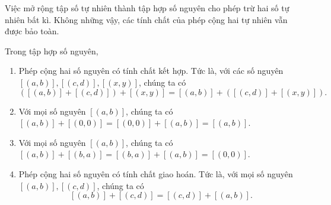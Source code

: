 Việc mở rộng tập số tự nhiên thành tập hợp số nguyên cho phép trừ hai số tự nhiên bất kì. Không những vậy, các tính chất của phép cộng hai tự nhiên vẫn được bảo toàn.
\begin{theorem}\label{theorem:group-of-integers}
	Trong tập hợp số nguyên,
	\begin{enumerate}[label={(\roman*)}]
		\item Phép cộng hai số nguyên có tính chất kết hợp. Tức là, với các số nguyên $[(a, b)], [(c, d)], [(x, y)]$, chúng ta có
		      \[
			      ([(a, b)] + [(c, d)]) + [(x, y)] = [(a, b)] + ([(c, d)] + [(x, y)]).
		      \]
		\item Với mọi số nguyên $[(a, b)]$, chúng ta có $[(a, b)] + [(0, 0)] = [(0, 0)] + [(a, b)] = [(a, b)]$.
		\item Với mọi số nguyên $[(a, b)]$, chúng ta có $[(a, b)] + [(b, a)] = [(b, a)] + [(a, b)] = [(0, 0)]$.
		\item Phép cộng hai số nguyên có tính chất giao hoán. Tức là, với mọi số nguyên $[(a, b)], [(c, d)]$, chúng ta có
		      \[
			      [(a, b)] + [(c, d)] = [(c, d)] + [(a, b)].
		      \]
	\end{enumerate}
\end{theorem}

